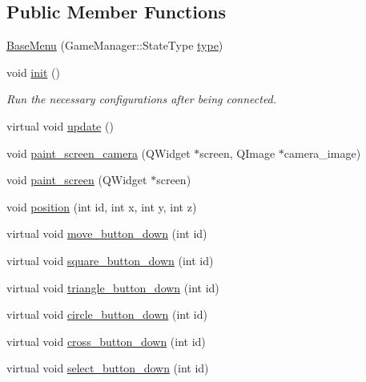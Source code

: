 \subsection*{Public Member Functions}
\begin{DoxyCompactItemize}
\item 
\hyperlink{class_base_menu_a4b6db156f76cc8ed156dfce7baf941e4}{Base\-Menu} (Game\-Manager\-::\-State\-Type \hyperlink{class_game_state_afc2d4395529e7ecba05379a8f5f224c5}{type})
\item 
\hypertarget{class_base_menu_abd14378797eab8eba6530b1b5851e6a8}{void \hyperlink{class_base_menu_abd14378797eab8eba6530b1b5851e6a8}{init} ()}\label{class_base_menu_abd14378797eab8eba6530b1b5851e6a8}

\begin{DoxyCompactList}\small\item\em Run the necessary configurations after being connected. \end{DoxyCompactList}\item 
virtual void \hyperlink{class_base_menu_a4679a8f7c2872606910baa1b08fe0ba1}{update} ()
\item 
void \hyperlink{class_base_menu_ad75153fdfff53b0421beb9674c0237e3}{paint\-\_\-screen\-\_\-camera} (Q\-Widget $\ast$screen, Q\-Image $\ast$camera\-\_\-image)
\item 
void \hyperlink{class_base_menu_ae45dccc7c3b8da62b4cd0d5b6c211a12}{paint\-\_\-screen} (Q\-Widget $\ast$screen)
\item 
void \hyperlink{class_base_menu_a9c2bc1403e96c1bd411883a47e47155b}{position} (int id, int x, int y, int z)
\item 
virtual void \hyperlink{class_base_menu_a8a1dbfb5c20ec003050e92e016bcde6a}{move\-\_\-button\-\_\-down} (int id)
\item 
virtual void \hyperlink{class_base_menu_adf4b11d9031d6ed0919fee1692bb1261}{square\-\_\-button\-\_\-down} (int id)
\item 
virtual void \hyperlink{class_base_menu_ac948643ada097b818c3f9b9e3249dc68}{triangle\-\_\-button\-\_\-down} (int id)
\item 
virtual void \hyperlink{class_base_menu_a272616b4c8caa96e086e727127a02aa2}{circle\-\_\-button\-\_\-down} (int id)
\item 
virtual void \hyperlink{class_base_menu_a5ef0f20274ea6470de07f15f34450f72}{cross\-\_\-button\-\_\-down} (int id)
\item 
virtual void \hyperlink{class_base_menu_a2b0ee601bce564f9cd1870c704025677}{select\-\_\-button\-\_\-down} (int id)

\end{DoxyCompactItemize}
